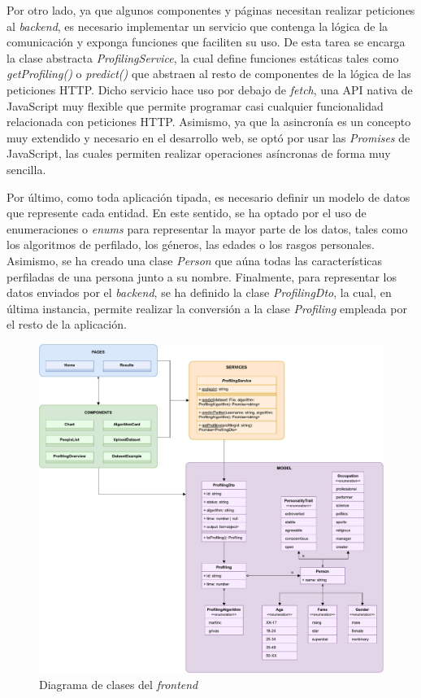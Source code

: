 \bigskip
Por otro lado, ya que algunos componentes y páginas necesitan realizar peticiones al \textit{backend}, es necesario implementar un servicio
que contenga la lógica de la comunicación y exponga funciones que faciliten su uso. De esta tarea se encarga la clase abstracta \textit{ProfilingService},
la cual define funciones estáticas tales como \textit{getProfiling()} o \textit{predict()} que abstraen al resto de componentes de la lógica de las peticiones HTTP.
Dicho servicio hace uso por debajo de \textit{fetch}, una API nativa de JavaScript muy flexible que permite programar casi cualquier funcionalidad
relacionada con peticiones HTTP. Asimismo, ya que la asincronía es un concepto muy extendido y necesario en el desarrollo web, se optó
por usar las \textit{Promises} de JavaScript, las cuales permiten realizar operaciones asíncronas de forma muy sencilla.

\bigskip
Por último, como toda aplicación tipada, es necesario definir un modelo de datos que represente cada entidad. En este sentido, se ha optado
por el uso de enumeraciones o \textit{enums} para representar la mayor parte de los datos, tales como los algoritmos de perfilado, los géneros,
las edades o los rasgos personales. Asimismo, se ha creado una clase \textit{Person} que aúna todas las características
perfiladas de una persona junto a su nombre. Finalmente, para representar los datos enviados por el \textit{backend}, se ha definido la clase \textit{ProfilingDto},
la cual, en última instancia, permite realizar la conversión a la clase \textit{Profiling} empleada por el resto de la aplicación.

\bigskip
\begin{figure}[H]
	\centering
	\includegraphics[width=\textwidth]{diagramas/clases_front.pdf}
	\caption{Diagrama de clases del \textit{frontend}}
	\label{fig:clases_frontend}
\end{figure}
